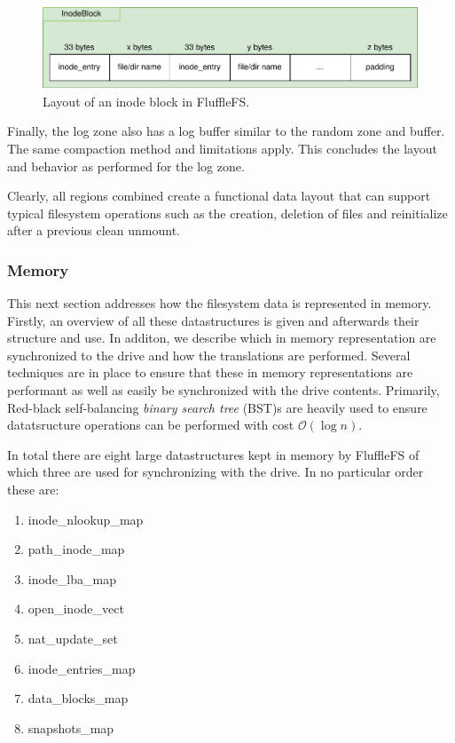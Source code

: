 \begin{figure}[h!]
    \centering
	\includegraphics[width=1\textwidth]{resources/images/fluffle-inodeblock.pdf}
	\caption{Layout of an inode block in FluffleFS.}
    \label{figure:fluffleinodeblock}
\end{figure}

Finally, the log zone also has a log buffer similar to the random zone and
buffer. The same compaction method and limitations apply. This concludes the
layout and behavior as performed for the log zone.

Clearly, all regions combined create a functional data layout that can support
typical filesystem operations such as the creation, deletion of files and
reinitialize after a previous clean unmount.

\subsubsection{Memory}

This next section addresses how the filesystem data is represented in memory.
Firstly, an overview of all these datastructures is given and afterwards their
structure and use. In additon, we describe which in memory representation are
synchronized to the drive and how the translations are performed. Several
techniques are in place to ensure that these in memory representations are
performant as well as easily be synchronized with the drive contents. Primarily,
Red-black self-balancing \textit{binary search tree} (BST)s
\cite{Bayer2004SymmetricBB} are heavily used to ensure datatsructure operations
can be performed with cost $\mathcal{O}(\log n)$.

In total there are eight large datastructures kept in memory by FluffleFS of
which three are used for synchronizing with the drive. In no particular order
these are:

\begin{enumerate}
    \item inode\_nlookup\_map
    \item path\_inode\_map
    \item inode\_lba\_map
    \item open\_inode\_vect
    \item nat\_update\_set
    \item inode\_entries\_map
    \item data\_blocks\_map
    \item snapshots\_map
\end{enumerate}

